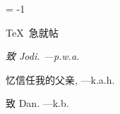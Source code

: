 %




\pageno = -1


%
\centerline{\chapterfonts \TeX\ 急就帖}

\noheadlinetrue\pagebreak


%
\blankpage

\blankpage


{ }
\noheadlinetrue


%
\sinkage
{\it \flushright
   致 Jodi.
   ---{\sc p.w.a.}

   忆信任我的父亲,
   ---{\sc k.a.h.}

   致 Dan.
   ---{\sc k.b.}
}
\pagebreak



\blankpage
{ }

%
%
\rewritetocfilefalse
%
\blankpage
{}

\shortcontents


\ifcompletebook \global\rewritetocfiletrue \fi


\contents

\blankpage
{ }

\byebye
